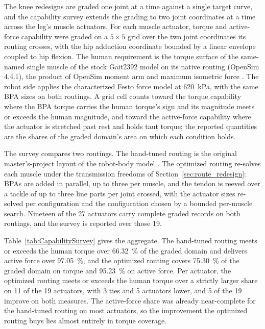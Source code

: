 \documentclass[utf8]{FrontiersinHarvard} %
\begin{document}
The knee redesigns are graded one joint at a time against a single target curve, and the capability survey extends the grading to two joint coordinates at a time across the leg's muscle actuators. For each muscle actuator, torque and active-force capability were graded on a $5 \times 5$ grid over the two joint coordinates its routing crosses, with the hip adduction coordinate bounded by a linear envelope coupled to hip flexion. The human requirement is the torque surface of the same-named single muscle of the stock Gait2392 model on its native routing (OpenSim 4.4.1), the product of OpenSim moment arm and maximum isometric force \citep{delp_opensim_2007, seth_opensim_2018}. The robot side applies the characterized Festo force model \citep{bolen_2026} at \qty{620}{\kPa}, with the same BPA sizes on both routings. A grid cell counts toward the torque capability where the BPA torque carries the human torque's sign and its magnitude meets or exceeds the human magnitude, and toward the active-force capability where the actuator is stretched past rest and holds taut torque; the reported quantities are the shares of the graded domain's area on which each condition holds.

The survey compares two routings. The hand-tuned routing is the original master's-project layout of the robot-body model \citep{morrow_optimization_2020}. The optimized routing re-solves each muscle under the transmission freedoms of Section~\ref{sec:route_redesign}: BPAs are added in parallel, up to three per muscle, and the tendon is reeved over a tackle of up to three line parts per joint crossed, with the actuator sizes re-solved per configuration and the configuration chosen by a bounded per-muscle search. Nineteen of the 27 actuators carry complete graded records on both routings, and the survey is reported over those 19.

Table~\ref{tab:CapabilitySurvey} gives the aggregate. The hand-tuned routing meets or exceeds the human torque over \qty{66.32}{\percent} of the graded domain and delivers active force over \qty{97.05}{\percent}, and the optimized routing covers \qty{75.30}{\percent} of the graded domain on torque and \qty{95.23}{\percent} on active force. Per actuator, the optimized routing meets or exceeds the human torque over a strictly larger share on 11 of the 19 actuators, with 3 ties and 5 actuators lower, and 5 of the 19 improve on both measures. The active-force share was already near-complete for the hand-tuned routing on most actuators, so the improvement the optimized routing buys lies almost entirely in torque coverage.
\end{document}
